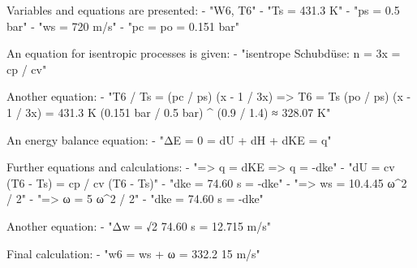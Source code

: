 Variables and equations are presented:
- "W6, T6"
- "Ts = 431.3 K"
- "ps = 0.5 bar"
- "ws = 720 m/s"
- "pc = po = 0.151 bar"

An equation for isentropic processes is given:
- "isentrope Schubdüse: n = 3x = cp / cv"

Another equation:
- "T6 / Ts = (pc / ps) (x - 1 / 3x) => T6 = Ts (po / ps) (x - 1 / 3x) = 431.3 K (0.151 bar / 0.5 bar) ^ (0.9 / 1.4) ≈ 328.07 K"

An energy balance equation:
- "ΔE = 0 = dU + dH + dKE = q"

Further equations and calculations:
- "=> q = dKE => q = -dke"
- "dU = cv (T6 - Ts) = cp / cv (T6 - Ts)"
- "dke = 74.60 s = -dke"
- "=> ws = 10.4.45 ω^2 / 2"
- "=> ω = 5 ω^2 / 2"
- "dke = 74.60 s = -dke"

Another equation:
- "Δw = √2 74.60 s = 12.715 m/s"

Final calculation:
- "w6 = ws + ω = 332.2 15 m/s"